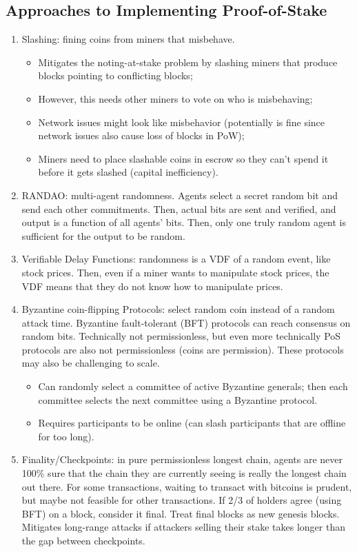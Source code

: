 \documentclass[dvipsnames]{article}
\theoremstyle{definition}
\theoremstyle{remark}
\begin{document}
\subsection{Approaches to Implementing Proof-of-Stake}
\begin{enumerate}
	\item Slashing: fining coins from miners that misbehave. 
	\begin{itemize}
		\item Mitigates the noting-at-stake problem by slashing miners that produce blocks pointing to conflicting blocks;
		\item However, this needs other miners to vote on who is misbehaving;
		\item Network issues might look like misbehavior (potentially is fine since network issues also cause loss of blocks in PoW);
		\item Miners need to place slashable coins in escrow so they can't spend it before it gets slashed (capital inefficiency).
	\end{itemize}
	\item RANDAO: multi-agent randomness. Agents select a secret random bit and send each other commitments. Then, actual bits are sent and verified, and output is a function of all agents' bits. Then, only one truly random agent is sufficient for the output to be random.
	\item Verifiable Delay Functions: randomness is a VDF of a random event, like stock prices. Then, even if a miner wants to manipulate stock prices, the VDF means that they do not know how to manipulate prices.
	\item Byzantine coin-flipping Protocols: select random coin instead of a random attack time. Byzantine fault-tolerant (BFT) protocols can reach consensus on random bits. Technically not permissionless, but even more technically PoS protocols are also not permissionless (coins are permission). These protocols may also be challenging to scale.
	\begin{itemize}
		\item Can randomly select a committee of active Byzantine generals; then each committee selects the next committee using a Byzantine protocol.
		\item Requires participants to be online (can slash participants that are offline for too long).
	\end{itemize}
	\item Finality/Checkpoints: in pure permissionless longest chain, agents are never 100\% sure that the chain they are currently seeing is really the longest chain out there. For some transactions, waiting to transact with bitcoins is prudent, but maybe not feasible for other transactions. If 2/3 of holders agree (using BFT) on a block, consider it final. Treat final blocks as new genesis blocks. Mitigates long-range attacks if attackers selling their stake takes longer than the gap between checkpoints.

\end{enumerate}
\end{document}
